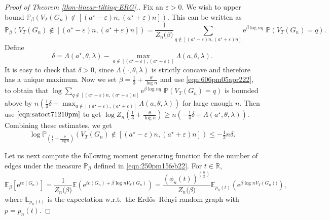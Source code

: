 \documentclass[bj,authoryear,noshowframe]{imsart}
\numberwithin{equation}{section}
\theoremstyle{plain}
\theoremstyle{definition}
\newcommand{\vep}{\varepsilon}
\newcommand{\erdos}{Erd\H{o}s--R\'enyi random graph}
\newcommand{\e}{{\mathrm e}}
\begin{document}
\begin{proof}[Proof of Theorem \ref{thm-linear-tilting-ERG}.] Fix an $\vep>0$. We wish to upper bound $\mathbb{P}_\beta(V_{T}(G_n) \not\in [(a^\star-\varepsilon)n, (a^\star+\varepsilon)n])$. This can be written as
\begin{equation}
\mathbb{P}_\beta\left(V_{T}(G_n) \not\in [(a^\star-\varepsilon)n, (a^\star+\varepsilon)n]\right) 
= \frac{1}{Z_n\big(\beta\big) }\sum_{q\not\in [(a^\star-\varepsilon)n, (a^\star+\varepsilon)n]} \mathrm{e}^{\beta \log{n} q} 
\,\, \mathbb{P}(V_{T}(G_n) =q).
\end{equation}
Define
\begin{equation}
\delta = \Lambda(a^\star,\theta,\lambda) - \max_{a\not\in [(a^\star-\varepsilon), (a^\star+\varepsilon)]} \Lambda(a,\theta,\lambda).
\end{equation}
It is easy to check that $\delta>0$, since $\Lambda(\cdot,\theta,\lambda)$ is strictly concave and therefore has a unique maximum. Now we set $\beta= \tfrac{1}{3}+\frac{\theta}{\log{n}}$ and use \eqref{eqn:606pm05apr222}, to obtain that $\log \sum_{q\not\in [(a^\star-\varepsilon)n, (a^\star+\varepsilon)n]} \mathrm{e}^{\beta \log{n} q} \,\, \mathbb{P}(V_{T}(G_n) =q)$ is bounded above by $n(\tfrac14\delta+ \max_{a\not\in [(a^\star-\varepsilon), (a^\star+\varepsilon)]} \Lambda(a,\theta,\lambda))$ for large enough $n$. Then use $\eqref{eqn:satoct71210pm}$ to get $\log Z_n(\tfrac{1}{3}+\tfrac{\theta}{\log{n}}) \geq n(-\tfrac14\delta+ \Lambda(a^\star,\theta,\lambda))$. Combining these estimates, we get
\begin{equation}
\log \mathbb{P}_{(\tfrac{1}{3}+\frac{\theta}{\log{n}})}\left(V_{T}(G_n) 
\not\in [(a^\star-\varepsilon)n, (a^\star+\varepsilon)n]\right) \leq - \tfrac12 n\delta.
\end{equation}

Let us next compute the following moment generating function for the number of edges under the measure $\mathbb{P}_\beta$ defined in \eqref{eqn:250pm15feb22}. For $t \in \mathbb{R}$,
\begin{equation}
\label{eqn:thunov9117pm}
\mathbb{E}_\beta\left[\e^{te(G_n)}\right]= \frac{1}{Z_n\big(\beta\big)} \mathbb{E}\left(\e^{te(G_n)+ \beta \log{n} V_{T}(G_n)}\right)
= \frac{\left(\phi_n(t)\right)^{{n\choose 2}}}{Z_n\big(\beta\big)} \mathbb{E}_{p_n(t)}\left(\e^{\beta \log{n} V_{T}(G_n))}\right),
\end{equation}
where $\mathbb{E}_{p_n(t)}$ is the expectation w.r.t.\ the \erdos{} with $p=p_n(t)$.
 

\end{proof}
\end{document}
